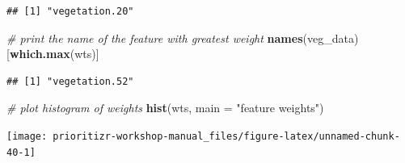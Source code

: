 \documentclass[12pt,]{book}
\newenvironment{Shaded}{\begin{snugshade}}{\end{snugshade}}
\newcommand{\KeywordTok}[1]{\textcolor[rgb]{0.13,0.29,0.53}{\textbf{#1}}}
\newcommand{\DataTypeTok}[1]{\textcolor[rgb]{0.13,0.29,0.53}{#1}}
\newcommand{\FloatTok}[1]{\textcolor[rgb]{0.00,0.00,0.81}{#1}}
\newcommand{\StringTok}[1]{\textcolor[rgb]{0.31,0.60,0.02}{#1}}
\newcommand{\CommentTok}[1]{\textcolor[rgb]{0.56,0.35,0.01}{\textit{#1}}}
\newcommand{\OtherTok}[1]{\textcolor[rgb]{0.56,0.35,0.01}{#1}}
\newcommand{\OperatorTok}[1]{\textcolor[rgb]{0.81,0.36,0.00}{\textbf{#1}}}
\newcommand{\NormalTok}[1]{#1}
\begin{document}
\begin{verbatim}
## [1] "vegetation.20"
\end{verbatim}

\begin{Shaded}
\begin{Highlighting}[]
\CommentTok{# print the name of the feature with greatest weight}
\KeywordTok{names}\NormalTok{(veg_data)[}\KeywordTok{which.max}\NormalTok{(wts)]}
\end{Highlighting}
\end{Shaded}

\begin{verbatim}
## [1] "vegetation.52"
\end{verbatim}

\begin{Shaded}
\begin{Highlighting}[]
\CommentTok{# plot histogram of weights}
\KeywordTok{hist}\NormalTok{(wts, }\DataTypeTok{main =} \StringTok{"feature weights"}\NormalTok{)}
\end{Highlighting}
\end{Shaded}

\begin{center}\texttt{[image: prioritizr-workshop-manual\_files/figure-latex/unnamed-chunk-40-1]} \end{center}

\begin{Shaded}
\end{Shaded}
\end{document}
